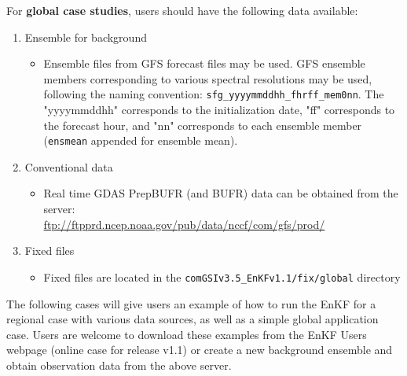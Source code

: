 For \textbf{global case studies}, users should have the following data available: 
\begin{enumerate}
\item Ensemble for background
\begin{itemize}
\item Ensemble files from GFS forecast files may be used. GFS ensemble members corresponding to various spectral resolutions may be used, following the naming convention: \verb|sfg_yyyymmddhh_fhrff_mem0nn|. The "yyyymmddhh" corresponds to the initialization date, "ff" corresponds to the forecast hour, and "nn" corresponds to each ensemble member (\verb|ensmean| appended for ensemble mean).
\end{itemize}
\item Conventional data
\begin{itemize}
\item Real time GDAS PrepBUFR (and BUFR) data can be obtained from the server:  \\
\url{ftp://ftpprd.ncep.noaa.gov/pub/data/nccf/com/gfs/prod/}
\end{itemize}
\item Fixed files
\begin{itemize}
\item Fixed files are located in the \verb|comGSIv3.5_EnKFv1.1/fix/global| directory
\end{itemize}
\end{enumerate}
The following cases will give users an example of how to run the EnKF for a regional case with various data sources, as well as a simple global application case. Users are welcome to download these examples from the EnKF User\textquotesingle s webpage (online case for release v1.1) or create a new background ensemble and obtain observation data from the above server.

